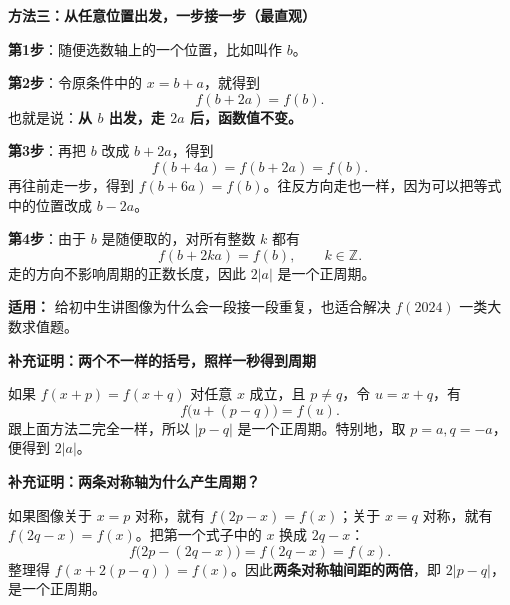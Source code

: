 \begin{proofbox}
\textbf{\textcolor{CProof}{方法三：从任意位置出发，一步接一步（最直观）}}



\textbf{第1步}：随便选数轴上的一个位置，比如叫作 $b$。

\textbf{第2步}：令原条件中的 $x=b+a$，就得到
\[
f(b+2a)=f(b).
\]
也就是说：\textbf{从 $b$ 出发，走 $2a$ 后，函数值不变。}

\textbf{第3步}：再把 $b$ 改成 $b+2a$，得到
\[
f(b+4a)=f(b+2a)=f(b).
\]
再往前走一步，得到 $f(b+6a)=f(b)$。往反方向走也一样，因为可以把等式中的位置改成 $b-2a$。

\textbf{第4步}：由于 $b$ 是随便取的，对所有整数 $k$ 都有
\[
\boxed{f(b+2ka)=f(b),\qquad k\in\mathbb Z.}
\]
走的方向不影响周期的正数长度，因此 $2|a|$ 是一个正周期。

\textbf{适用：} 给初中生讲图像为什么会一段接一段重复，也适合解决 $f(2024)$ 一类大数求值题。

\medskip
\end{proofbox}\clearpage\begin{proofbox}\textbf{\textcolor{CProof}{补充证明：两个不一样的括号，照样一秒得到周期}}



如果 $f(x+p)=f(x+q)$ 对任意 $x$ 成立，且 $p\ne q$，令 $u=x+q$，有
\[
f\big(u+(p-q)\big)=f(u).
\]
跟上面方法二完全一样，所以 $|p-q|$ 是一个正周期。特别地，取 $p=a,q=-a$，便得到 $2|a|$。

\medskip
\end{proofbox}\clearpage\begin{proofbox}\textbf{\textcolor{CProof}{补充证明：两条对称轴为什么产生周期？}}



如果图像关于 $x=p$ 对称，就有 $f(2p-x)=f(x)$；关于 $x=q$ 对称，就有 $f(2q-x)=f(x)$。把第一个式子中的 $x$ 换成 $2q-x$：
\[
f\big(2p-(2q-x)\big)=f(2q-x)=f(x).
\]
整理得 $f(x+2(p-q))=f(x)$。因此\textbf{两条对称轴间距的两倍}，即 $2|p-q|$，是一个正周期。
\end{proofbox}
